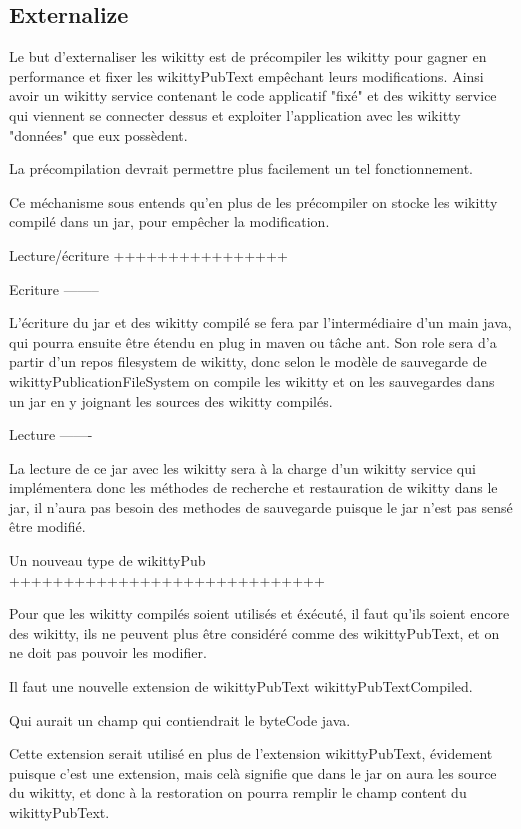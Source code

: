 \subsection{Externalize}


Le but d'externaliser les wikitty est de précompiler les wikitty pour gagner en 
performance et fixer les wikittyPubText empêchant leurs modifications. 
Ainsi avoir un wikitty service contenant le code applicatif "fixé" et des 
wikitty service qui viennent se connecter dessus et exploiter l'application avec
les wikitty "données" que eux possèdent.

La précompilation devrait permettre plus facilement un tel fonctionnement. 

Ce méchanisme sous entends qu'en plus de les précompiler on stocke les wikitty
compilé dans un jar, pour empêcher la modification.


Lecture/écriture
++++++++++++++++

Ecriture
--------

L'écriture du jar et des wikitty compilé se fera par l'intermédiaire d'un
main java, qui pourra ensuite être étendu en plug in maven ou tâche ant.
Son role sera d'a partir d'un repos filesystem de wikitty, donc selon 
le modèle de sauvegarde de wikittyPublicationFileSystem on compile les wikitty
et on les sauvegardes dans un jar en y joignant les sources des wikitty compilés.

Lecture
-------

La lecture de ce jar avec les wikitty sera à la charge d'un wikitty service qui
implémentera donc les méthodes de recherche et restauration de wikitty dans le
jar, il n'aura pas besoin des methodes de sauvegarde puisque le jar n'est 
pas sensé être modifié.


Un nouveau type de wikittyPub
+++++++++++++++++++++++++++++

Pour que les wikitty compilés soient utilisés et éxécuté, il faut qu'ils soient
encore des wikitty, ils ne peuvent plus être considéré comme des wikittyPubText,
et on ne doit pas pouvoir les modifier.

Il faut une nouvelle extension de wikittyPubText wikittyPubTextCompiled.

Qui aurait un champ qui contiendrait le byteCode java.

Cette extension serait utilisé en plus de l'extension wikittyPubText, évidement
puisque c'est une extension, mais celà signifie que dans le jar on aura les 
source du wikitty, et donc à la restoration on pourra remplir le champ content 
du wikittyPubText.




